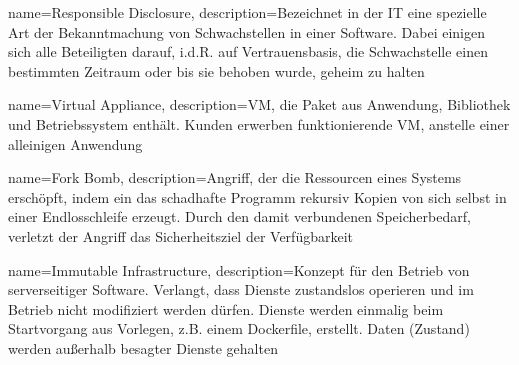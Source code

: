 {%
  name={Responsible Disclosure},
  description={Bezeichnet in der IT eine spezielle Art der Bekanntmachung von Schwachstellen in einer Software. Dabei einigen sich alle Beteiligten darauf, i.d.R. auf Vertrauensbasis, die Schwachstelle einen bestimmten Zeitraum oder bis sie behoben wurde, geheim zu halten}
}

{%
  name={Virtual Appliance},
  description={VM, die Paket aus Anwendung, Bibliothek und Betriebssystem enthält. Kunden erwerben funktionierende VM, anstelle einer alleinigen Anwendung \cite[S.672f.]{tanenbaumOS}}
}

{%
  name={Fork Bomb},
  description={Angriff, der die Ressourcen eines Systems erschöpft, indem ein das schadhafte Programm rekursiv Kopien von sich selbst in einer Endlosschleife erzeugt. Durch den damit verbundenen Speicherbedarf, verletzt der Angriff das Sicherheitsziel der Verfügbarkeit}
}

{%
  name={Immutable Infrastructure},
  description={Konzept für den Betrieb von serverseitiger Software. Verlangt, dass Dienste zustandslos operieren und im Betrieb nicht modifiziert werden dürfen. Dienste werden einmalig beim Startvorgang aus Vorlegen, z.B. einem Dockerfile, erstellt. Daten (Zustand) werden außerhalb besagter Dienste gehalten \cite{unikernelMeetsDocker}\cite{immutableInfrastructure}}
}
